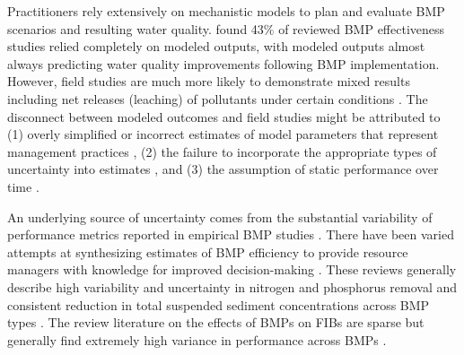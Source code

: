 \documentclass[utf8]{FrontiersinHarvard}
\begin{document}
Practitioners rely extensively on mechanistic models to plan and evaluate BMP scenarios and resulting water quality.
\citet{linternBestManagementPractices2020} found 43\% of reviewed BMP effectiveness studies relied completely on modeled outputs, with modeled outputs almost always predicting water quality improvements following BMP implementation.
However, field studies are much more likely to demonstrate mixed results including net releases (leaching) of pollutants under certain conditions \citep{linternBestManagementPractices2020, liuReviewEffectivenessBest2017}.
The disconnect between modeled outcomes and field studies might be attributed to (1) overly simplified or incorrect estimates of model parameters that represent management practices \citep{ullrichApplicationSoilWater2009, fuReviewCatchmentscaleWater2019, linternBestManagementPractices2020}, (2) the failure to incorporate the appropriate types of uncertainty into estimates \citep{tasdighiBayesianTotalUncertainty2018, fuReviewCatchmentscaleWater2019, linternBestManagementPractices2020}, and (3) the assumption of static performance over time \citep{mealsLagTimeWater2010, liuReviewEffectivenessBest2017, fuReviewCatchmentscaleWater2019}.

An underlying source of uncertainty comes from the substantial variability of performance metrics reported in empirical BMP studies \citep{linternBestManagementPractices2020}.
There have been varied attempts at synthesizing estimates of BMP efficiency to provide resource managers with knowledge for improved decision-making \citep{agouridisLivestockGrazingManagement2005, barrettComparisonBMPPerformance2008, claryBMPPerformanceAnalysis2011, grudzinskiDoesRiparianFencing2020, horvathEffectsRegionalClimate2023, kochNitrogenRemovalStormwater2014, krogerReviewBestManagement2012, liuReviewEffectivenessBest2017, simpsonDevelopingBestManagement2009}.
These reviews generally describe high variability and uncertainty in nitrogen and phosphorus removal and consistent reduction in total suspended sediment concentrations across BMP types \citep{linternBestManagementPractices2020, liuReviewEffectivenessBest2017, kochNitrogenRemovalStormwater2014, claryBMPPerformanceAnalysis2011, barrettComparisonBMPPerformance2008, grudzinskiDoesRiparianFencing2020}.
The review literature on the effects of BMPs on FIBs are sparse but generally find extremely high variance in performance across BMPs \citep{claryBMPPerformanceAnalysis2011, grudzinskiDoesRiparianFencing2020}.
\end{document}
